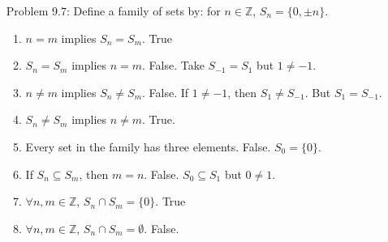 \documentclass{article}
\theoremstyle{claim}
\theoremstyle{definition}
\begin{document}
\begin{enumerate}
\begin{proof}
\begin{enumerate}
                    \begin{enumerate}
                        \item[Case 1:] $a \in A \cap B$. So $a \in A$ and $a \in B$. So $a \in B \cup C$. Since $a \in A$, $a \in A \cap (B \cup C)$.
                        \item[Case 2:] $a \in A \cap C$. So $a \in A$ and $a \in C$. So $a \in B \cup C$. Since $a \in A$, $a \in A \cap (B \cup C)$.
                    \end{enumerate}
                    Thus $(A \cap B) \cup (A \cap C) \subseteq A \cap (B \cup C)$.
            \end{enumerate}
            So $A \cap (B \cup C) = (A \cap B) \cup (A \cap C)$.
        \end{proof}
    \item[Problem 9.7:] Define a family of sets by: for $n \in \mathbb{Z}$, $S_n = \{ 0, \pm n \}$.
        \begin{enumerate}
            \item $n = m$ implies $S_n = S_m$. True
            \item $S_n = S_m$ implies $n = m$. False. Take $S_{-1} = S_1$ but $1 \ne -1$.
            \item $n \ne m$ implies $S_n \ne S_m$. False. If $1 \ne -1$, then $S_{1} \ne S_{-1}$. But $S_{1} = S_{-1}$.
            \item $S_n \ne S_m$ implies $n \ne m$. True.
            \item Every set in the family has three elements. False. $S_{0} = \{ 0 \}$.
            \item If $S_n \subseteq S_m$, then $m = n$. False. $S_{0} \subseteq S_{1}$ but $0 \ne 1$.
            \item $\forall n, m \in \mathbb{Z}$, $S_n \cap S_m = \{ 0 \}$. True
            \item $\forall n, m \in \mathbb{Z}$, $S_n \cap S_m = \emptyset$. False.
        \end{enumerate}
\end{enumerate}
\end{document}
